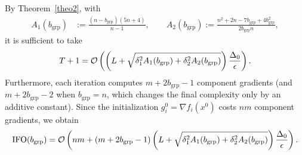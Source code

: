 \documentclass{article}
\newcommand{\cO}{{\cal O}}
\newcommand{\eqdef}{:=}
\newcommand{\rb}[1]{\left(#1\right)}
\theoremstyle{plain}
\begin{document}
By Theorem~\ref{theo2}, with
\begin{align*}
A_1(b_{\mathrm{grp}}) &\eqdef \frac{(n-b_{\mathrm{grp}})(5n+4)}{n-1},
\qquad
A_2(b_{\mathrm{grp}}) \eqdef \frac{n^2+2n-7b_{\mathrm{grp}}+4b_{\mathrm{grp}}^2}{2b_{\mathrm{grp}}n},
\end{align*}
it is sufficient to take
\begin{align*}
T+1
=
\cO\rb{
\rb{
L+\sqrt{\delta_1^2 A_1(b_{\mathrm{grp}})+\delta_2^2 A_2(b_{\mathrm{grp}})}
}\frac{\Delta_0}{\epsilon}
}.
\end{align*}
Furthermore, each iteration computes $m+2b_{\mathrm{grp}}-1$ component gradients (and $m+2b_{\mathrm{grp}}-2$ when $b_{\mathrm{grp}}=n$, which changes the final complexity only by an additive constant). Since the initialization $g_i^0=\nabla f_i(x^0)$ costs $nm$ component gradients, we obtain
\begin{align}
\label{eq:ifo_ngtm_exact_b}
\mathrm{IFO}(b_{\mathrm{grp}})
=
\cO\rb{
nm +
\rb{m+2b_{\mathrm{grp}}-1}
\rb{
L+\sqrt{\delta_1^2 A_1(b_{\mathrm{grp}})+\delta_2^2 A_2(b_{\mathrm{grp}})}
}
\frac{\Delta_0}{\epsilon}
}.
\end{align}
\end{document}
